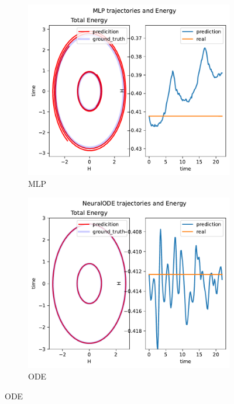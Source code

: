 \begin{figure}[H]
	\centering
	\begin{subfigure}[b]{0.3\textwidth}
		\centering
		\includegraphics[width=\textwidth]{chapters/chapter5/body2_mlp_traj.pdf}
		\caption{MLP}
	\end{subfigure}
	\hfill
	\begin{subfigure}[b]{0.3\textwidth}
		\centering
		\includegraphics[width=\textwidth]{chapters/chapter5/body2_ode_traj.pdf}
		\caption{ODE}
	\end{subfigure}

\end{figure}
